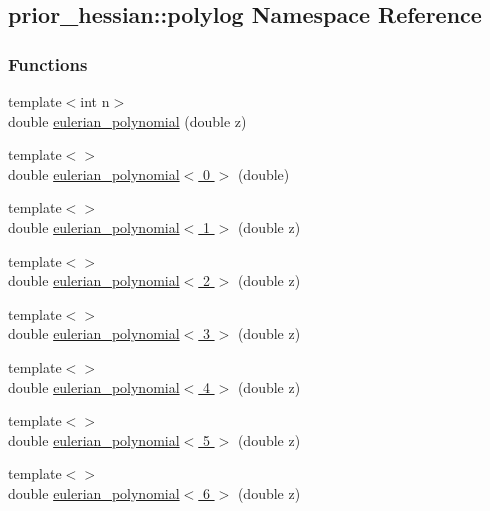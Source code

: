 \hypertarget{namespaceprior__hessian_1_1polylog}{}\subsection{prior\+\_\+hessian\+:\+:polylog Namespace Reference}
\label{namespaceprior__hessian_1_1polylog}
\subsubsection*{Functions}
\begin{DoxyCompactItemize}
\item 
{\footnotesize template$<$int n$>$ }\\double \hyperlink{namespaceprior__hessian_1_1polylog_a329ad31f0b2ebd507f969067103adea7}{eulerian\+\_\+polynomial} (double z)
\item 
{\footnotesize template$<$$>$ }\\double \hyperlink{namespaceprior__hessian_1_1polylog_aa691a3272d02cfb22cf9bbfe6d37131e}{eulerian\+\_\+polynomial$<$ 0 $>$} (double)
\item 
{\footnotesize template$<$$>$ }\\double \hyperlink{namespaceprior__hessian_1_1polylog_a7e9bf19ef60fa1e7c17ac6ffbb8cd5bd}{eulerian\+\_\+polynomial$<$ 1 $>$} (double z)
\item 
{\footnotesize template$<$$>$ }\\double \hyperlink{namespaceprior__hessian_1_1polylog_a79c383d1be5bf5da28e8735c1deadc31}{eulerian\+\_\+polynomial$<$ 2 $>$} (double z)
\item 
{\footnotesize template$<$$>$ }\\double \hyperlink{namespaceprior__hessian_1_1polylog_aa63cfe2d87dc42a0c1b9bae049759d8d}{eulerian\+\_\+polynomial$<$ 3 $>$} (double z)
\item 
{\footnotesize template$<$$>$ }\\double \hyperlink{namespaceprior__hessian_1_1polylog_a7c0eabb95ea5409645a5c6a1e634d8d0}{eulerian\+\_\+polynomial$<$ 4 $>$} (double z)
\item 
{\footnotesize template$<$$>$ }\\double \hyperlink{namespaceprior__hessian_1_1polylog_af257c6bed7aba2638d0bfc8f0eb2f391}{eulerian\+\_\+polynomial$<$ 5 $>$} (double z)
\item 
{\footnotesize template$<$$>$ }\\double \hyperlink{namespaceprior__hessian_1_1polylog_aa4f73b479dce7efface0d52a49efc6e4}{eulerian\+\_\+polynomial$<$ 6 $>$} (double z)

\end{DoxyCompactItemize}
